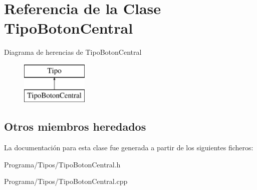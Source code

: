 \hypertarget{class_tipo_boton_central}{\section{Referencia de la Clase Tipo\-Boton\-Central}
\label{class_tipo_boton_central}
}
Diagrama de herencias de Tipo\-Boton\-Central\begin{figure}[H]
\begin{center}
\leavevmode
\includegraphics[height=2.000000cm]{class_tipo_boton_central}
\end{center}
\end{figure}
\subsection*{Otros miembros heredados}


La documentación para esta clase fue generada a partir de los siguientes ficheros\-:\begin{DoxyCompactItemize}
\item 
Programa/\-Tipos/Tipo\-Boton\-Central.\-h\item 
Programa/\-Tipos/Tipo\-Boton\-Central.\-cpp\end{DoxyCompactItemize}
